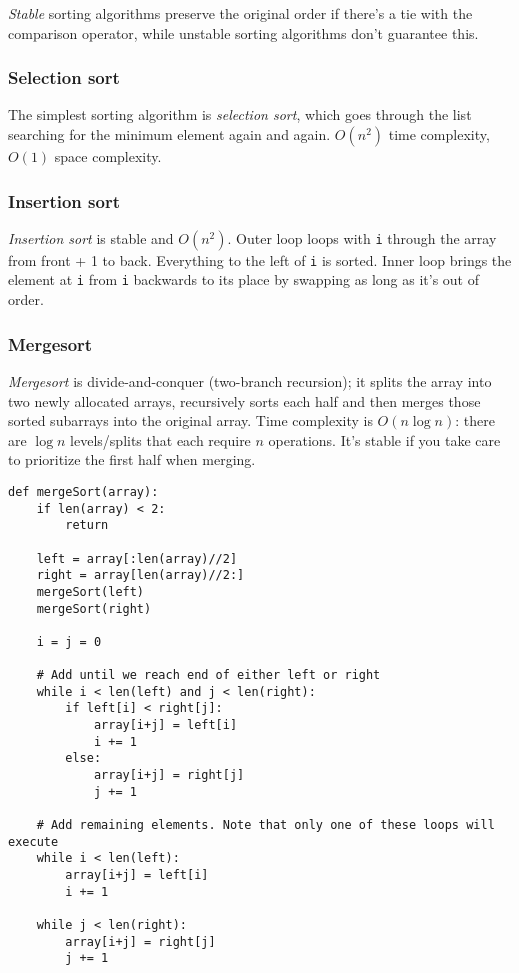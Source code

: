 \documentclass[8pt, table, xcdraw]{article}%
\begin{document}
\emph{Stable} sorting algorithms preserve the original order if there's a tie with the comparison operator, while unstable sorting algorithms don't guarantee this.

\subsubsection{Selection sort}

The simplest sorting algorithm is \emph{selection sort}, which goes through the list searching for the minimum element again and again. $O(n^2)$ time complexity, $O(1)$ space complexity.

\subsubsection{Insertion sort}

\emph{Insertion sort} is stable and $O(n^2)$. Outer loop loops with \lstinline{i} through the array from front + 1 to back. Everything to the left of \lstinline{i} is sorted. Inner loop brings the element at \lstinline{i} from \lstinline{i} backwards to its place by swapping as long as it's out of order.

\subsubsection{Mergesort}

\emph{Mergesort} is divide-and-conquer (two-branch recursion); it splits the array into two newly allocated arrays, recursively sorts each half and then merges those sorted subarrays into the original array. Time complexity is $O(n \log n)$: there are $\log n$ levels/splits that each require $n$ operations. It's stable if you take care to prioritize the first half when merging.

\begin{lstlisting}
def mergeSort(array):
    if len(array) < 2:
        return
    
    left = array[:len(array)//2]
    right = array[len(array)//2:]
    mergeSort(left)
    mergeSort(right)

    i = j = 0

    # Add until we reach end of either left or right
    while i < len(left) and j < len(right):
        if left[i] < right[j]:
            array[i+j] = left[i]
            i += 1
        else:
            array[i+j] = right[j]
            j += 1

    # Add remaining elements. Note that only one of these loops will execute
    while i < len(left):
        array[i+j] = left[i]
        i += 1

    while j < len(right):
        array[i+j] = right[j]
        j += 1
\end{lstlisting}
\end{document}
